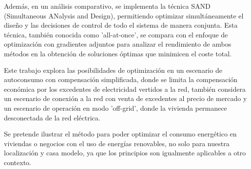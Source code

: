 Además, en un análisis comparativo, se implementa la técnica SAND (Simultaneous
ANalysis and Design), permitiendo optimizar simultáneamente el diseño y las
decisiones de control de todo el sistema de manera conjunta. Esta técnica,
también conocida como 'all-at-once', se compara con el enfoque de optimización
con gradientes adjuntos para analizar el rendimiento de ambos métodos en la
obtención de soluciones óptimas que minimicen el coste total.

Este trabajo explora las posibilidades de optimización en un escenario de
autoconsumo con compensación simplificada, donde se limita la compensación
económica por los excedentes de electricidad vertidos a la red, también
considera un escenario de conexión a la red con venta de excedentes al precio
de mercado y un escenario de operación en modo 'off-grid', donde la vivienda
permanece desconectada de la red eléctrica.

Se pretende ilustrar el método para poder optimizar el consumo energético en
viviendas o negocios con el uso de energías renovables, no solo para nuestra
localización y casa modelo, ya que los principios son igualmente aplicables a
otro contexto.

